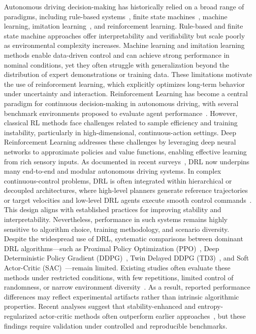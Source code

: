\documentclass[]{interact}
\begin{document}
Autonomous driving decision-making has historically relied on a broad range of paradigms, including rule-based systems~\cite{bouchard2015rulebased}, finite state machines~\cite{bae2020fsm}, machine learning, imitation learning~\cite{codevilla2018il,cheng2023pluto,moncalvillo2024ackermann}, and reinforcement learning. Rule-based and finite state machine approaches offer interpretability and verifiability but scale poorly as environmental complexity increases. Machine learning and imitation learning methods enable data-driven control and can achieve strong performance in nominal conditions, yet they often struggle with generalization beyond the distribution of expert demonstrations or training data. These limitations motivate the use of reinforcement learning, which explicitly optimizes long-term behavior under uncertainty and interaction.
Reinforcement Learning has become a central paradigm for continuous decision-making in autonomous driving, with several benchmark environments proposed to evaluate agent performance~\cite{liu2021rlbenchmark,lavington2024torchdriveenv}. However, classical RL methods face challenges related to sample efficiency and training instability, particularly in high-dimensional, continuous-action settings. Deep Reinforcement Learning addresses these challenges by leveraging deep neural networks to approximate policies and value functions, enabling effective learning from rich sensory inputs. As documented in recent surveys~\cite{kiran2021rl,prasuna2024deep,singh2025improvised}, DRL now underpins many end-to-end and modular autonomous driving systems.
In complex continuous-control problems, DRL is often integrated within hierarchical or decoupled architectures, where high-level planners generate reference trajectories or target velocities and low-level DRL agents execute smooth control commands~\cite{wang2024benchmarking,qiao2020hierarchical}. This design aligns with established practices for improving stability and interpretability. Nevertheless, performance in such systems remains highly sensitive to algorithm choice, training methodology, and scenario diversity.
Despite the widespread use of DRL, systematic comparisons between dominant DRL algorithms—such as Proximal Policy Optimization (PPO)~\cite{schulman2017proximal}, Deep Deterministic Policy Gradient (DDPG)~\cite{lillicrap2015continuous}, Twin Delayed DDPG (TD3)~\cite{fujimoto2018addressing}, and Soft Actor-Critic (SAC)~\cite{haarnoja2019sac}—remain limited. Existing studies often evaluate these methods under restricted conditions, with few repetitions, limited control of randomness, or narrow environment diversity~\cite{evans2024racing,li2025sharpturns}. As a result, reported performance differences may reflect experimental artifacts rather than intrinsic algorithmic properties. Recent analyses suggest that stability-enhanced and entropy-regularized actor-critic methods often outperform earlier approaches~\cite{liu2024evaluation,xu2024lanechanging,park2025comparative}, but these findings require validation under controlled and reproducible benchmarks.
\end{document}
